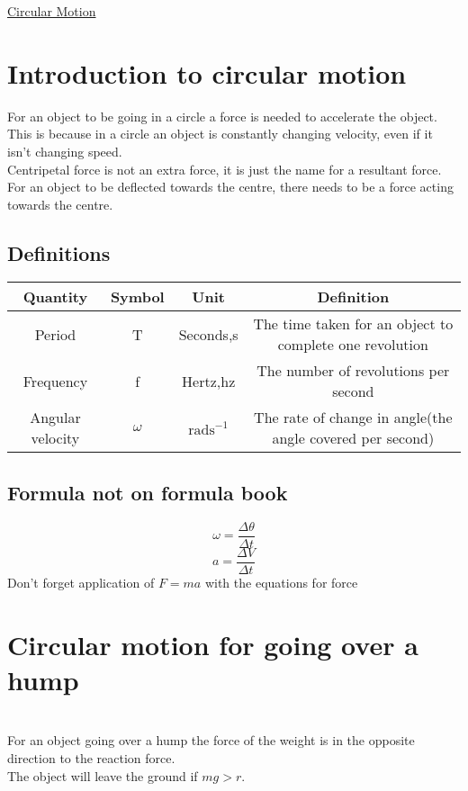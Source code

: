 \documentclass{article}[18pt]
\begin{document}
\begin{center}
\underline{\huge Circular Motion}
\end{center}
\section{Introduction to circular motion}
For an object to be going in a circle a force is needed to accelerate the object. This is because in a circle an object is constantly changing velocity, even if it isn't changing speed.\\
Centripetal force is not an extra force, it is just the name for a resultant force.\\
For an object to be deflected towards the centre, there needs to be a force acting towards the centre.
\subsection{Definitions}
\begin{tabular}{|c|c|c|c|}
\hline
Quantity&Symbol&Unit&Definition\\
\hline
Period&T&Seconds,s&The time taken for an object to complete one revolution\\
\hline
Frequency&f&Hertz,hz&The number of revolutions per second\\
\hline
Angular velocity&$\omega$&$\textrm{rads}^{-1}$&The rate of change in angle(the angle covered per second)\\
\hline
\end{tabular}
\subsection{Formula not on formula book}
$$\omega=\frac{\Delta\theta}{\Delta t}$$
$$a=\frac{\Delta V}{\Delta t}$$
Don't forget application of  $F=ma$ with the equations for force
\section{Circular motion for going over a hump}
\\
For an object going over a hump the force of the weight is in the opposite direction to the reaction force.\\
The object will leave the ground if $mg>r$.
\end{document}
